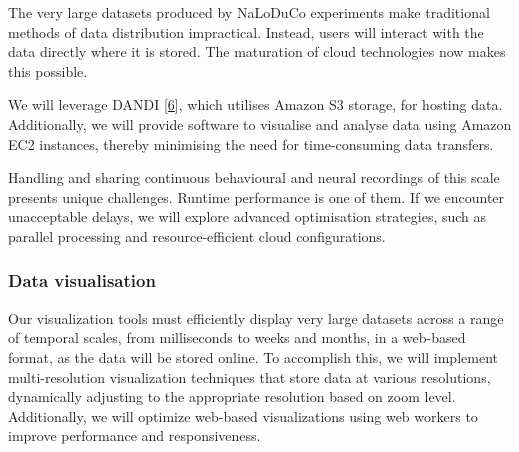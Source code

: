 The very large datasets produced by NaLoDuCo experiments make traditional
methods of data distribution impractical. Instead, users will interact with the
data directly where it is stored. The maturation of cloud technologies now
makes this possible.

We will leverage DANDI [\href{https://www.dandiarchive.org/}{6}], which utilises
Amazon S3 storage, for hosting data. Additionally, we will provide software
to visualise and analyse data using Amazon EC2 instances, thereby minimising
the need for time-consuming data transfers.

Handling and sharing continuous behavioural and neural recordings of this scale
presents unique challenges. Runtime performance is one of them. If we
encounter unacceptable delays, we will explore advanced optimisation
strategies, such as parallel processing and resource-efficient cloud
configurations.

\subsubsection{Data visualisation}

Our visualization tools must efficiently display very large datasets across a
range of temporal scales, from milliseconds to weeks and months, in a web-based
format, as the data will be stored online. To accomplish this, we will
implement multi-resolution visualization techniques that store data at various
resolutions, dynamically adjusting to the appropriate resolution based on zoom
level. Additionally, we will optimize web-based visualizations using web
workers to improve performance and responsiveness.


%
%

